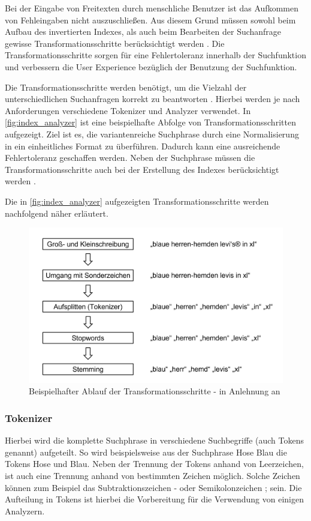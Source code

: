 Bei der Eingabe von Freitexten durch menschliche Benutzer ist das Aufkommen von Fehleingaben nicht auszuschließen. Aus diesem Grund müssen sowohl beim Aufbau des invertierten Indexes, als auch beim Bearbeiten der Suchanfrage gewisse Transformationsschritte berücksichtigt werden \cite{SebastianRuss.2017}. Die Transformationsschritte sorgen für eine Fehlertoleranz innerhalb der Suchfunktion und verbessern die User Experience bezüglich der Benutzung der Suchfunktion.

Die Transformationsschritte werden benötigt, um die Vielzahl der unterschiedlichen Suchanfragen korrekt zu beantworten \cite{SebastianRuss.2017}. Hierbei werden je nach Anforderungen verschiedene Tokenizer und Analyzer verwendet. In \autoref{fig:index_analyzer} ist eine beispielhafte Abfolge von Transformationsschritten aufgezeigt. Ziel ist es, die variantenreiche Suchphrase durch eine Normalisierung in ein einheitliches Format zu überführen. Dadurch kann eine ausreichende Fehlertoleranz geschaffen werden. Neben der Suchphrase müssen die Transformationsschritte auch bei der Erstellung des Indexes berücksichtigt werden \cite{SebastianRuss.2017}.

Die in \autoref{fig:index_analyzer} aufgezeigten Transformationsschritte werden nachfolgend näher erläutert.

\begin{figure}[H]
    \centering
    \includegraphics[width=0.65\linewidth]{images/Index_Analyzer.png}
    \caption{Beispielhafter Ablauf der Transformationsschritte - in Anlehnung an \cite{SebastianRuss.2017}}
    \label{fig:index_analyzer}
\end{figure}

\subsubsection{Tokenizer}

Hierbei wird die komplette Suchphrase in verschiedene Suchbegriffe (auch Tokens genannt) aufgeteilt. So wird beispielsweise aus der Suchphrase \glqq Hose Blau\grqq{} die Tokens \glqq Hose\grqq{} und \glqq Blau\grqq{}. Neben der Trennung der Tokens anhand von Leerzeichen, ist auch eine Trennung anhand von bestimmten Zeichen möglich. Solche Zeichen können zum Beispiel das Subtraktionszeichen \glqq -\grqq{} oder Semikolonzeichen \glqq ;\grqq{} sein. Die Aufteilung in Tokens ist hierbei die Vorbereitung für die Verwendung von einigen Analyzern.

